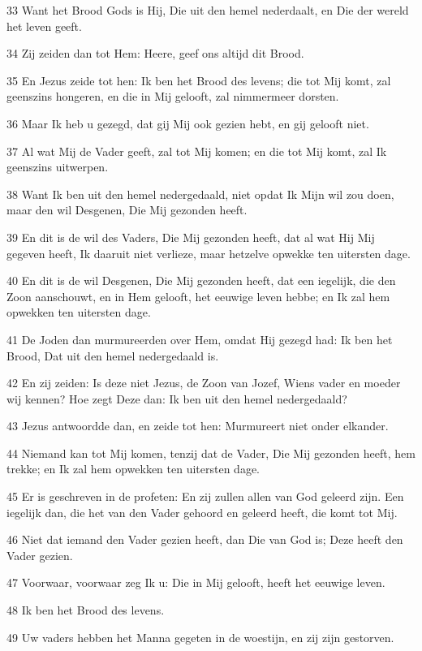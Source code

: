 \par 33 Want het Brood Gods is Hij, Die uit den hemel nederdaalt, en Die der wereld het leven geeft.
\par 34 Zij zeiden dan tot Hem: Heere, geef ons altijd dit Brood.
\par 35 En Jezus zeide tot hen: Ik ben het Brood des levens; die tot Mij komt, zal geenszins hongeren, en die in Mij gelooft, zal nimmermeer dorsten.
\par 36 Maar Ik heb u gezegd, dat gij Mij ook gezien hebt, en gij gelooft niet.
\par 37 Al wat Mij de Vader geeft, zal tot Mij komen; en die tot Mij komt, zal Ik geenszins uitwerpen.
\par 38 Want Ik ben uit den hemel nedergedaald, niet opdat Ik Mijn wil zou doen, maar den wil Desgenen, Die Mij gezonden heeft.
\par 39 En dit is de wil des Vaders, Die Mij gezonden heeft, dat al wat Hij Mij gegeven heeft, Ik daaruit niet verlieze, maar hetzelve opwekke ten uitersten dage.
\par 40 En dit is de wil Desgenen, Die Mij gezonden heeft, dat een iegelijk, die den Zoon aanschouwt, en in Hem gelooft, het eeuwige leven hebbe; en Ik zal hem opwekken ten uitersten dage.
\par 41 De Joden dan murmureerden over Hem, omdat Hij gezegd had: Ik ben het Brood, Dat uit den hemel nedergedaald is.
\par 42 En zij zeiden: Is deze niet Jezus, de Zoon van Jozef, Wiens vader en moeder wij kennen? Hoe zegt Deze dan: Ik ben uit den hemel nedergedaald?
\par 43 Jezus antwoordde dan, en zeide tot hen: Murmureert niet onder elkander.
\par 44 Niemand kan tot Mij komen, tenzij dat de Vader, Die Mij gezonden heeft, hem trekke; en Ik zal hem opwekken ten uitersten dage.
\par 45 Er is geschreven in de profeten: En zij zullen allen van God geleerd zijn. Een iegelijk dan, die het van den Vader gehoord en geleerd heeft, die komt tot Mij.
\par 46 Niet dat iemand den Vader gezien heeft, dan Die van God is; Deze heeft den Vader gezien.
\par 47 Voorwaar, voorwaar zeg Ik u: Die in Mij gelooft, heeft het eeuwige leven.
\par 48 Ik ben het Brood des levens.
\par 49 Uw vaders hebben het Manna gegeten in de woestijn, en zij zijn gestorven.

